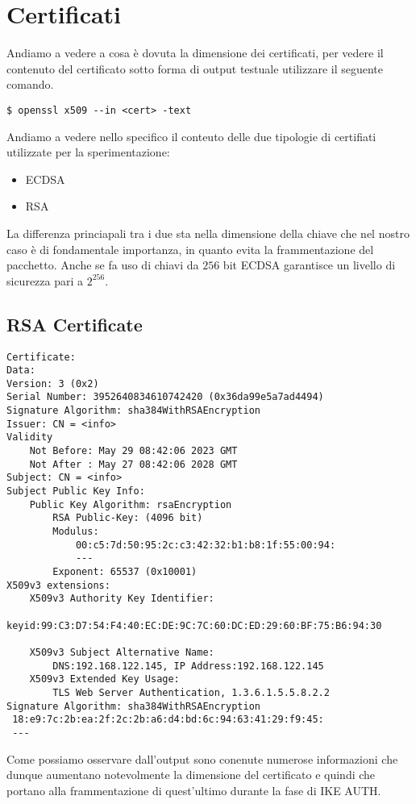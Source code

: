 \documentclass[
10pt, %
a4paper, %
oneside, %
headinclude,footinclude, %
BCOR5mm, %
]{scrartcl}
\begin{document}
\newpage
\section{Certificati}
\hypertarget{certificati}{}
Andiamo a vedere a cosa è dovuta la dimensione dei certificati, per vedere il contenuto del certificato sotto forma di output testuale utilizzare il seguente comando.
\begin{lstlisting}
$ openssl x509 --in <cert> -text
\end{lstlisting}

\vspace*{0.2cm}
\noindent
Andiamo a vedere nello specifico il conteuto delle due tipologie di certifiati utilizzate per la sperimentazione:
\begin{itemize}
    \item ECDSA
    \item RSA
\end{itemize}
\vspace*{0.2cm}
\noindent
La differenza princiapali tra i due sta nella dimensione della chiave che nel nostro caso è di fondamentale importanza, in quanto evita la frammentazione del pacchetto.
Anche se fa uso di chiavi da $256$ bit ECDSA garantisce un livello di sicurezza pari a $2^{256}$.
\subsection{RSA Certificate}
\begin{lstlisting}
Certificate:
Data:
Version: 3 (0x2)
Serial Number: 3952640834610742420 (0x36da99e5a7ad4494)
Signature Algorithm: sha384WithRSAEncryption
Issuer: CN = <info>
Validity
    Not Before: May 29 08:42:06 2023 GMT
    Not After : May 27 08:42:06 2028 GMT
Subject: CN = <info>
Subject Public Key Info:
    Public Key Algorithm: rsaEncryption
        RSA Public-Key: (4096 bit)
        Modulus:
            00:c5:7d:50:95:2c:c3:42:32:b1:b8:1f:55:00:94:
            ---
        Exponent: 65537 (0x10001)
X509v3 extensions:
    X509v3 Authority Key Identifier: 
        keyid:99:C3:D7:54:F4:40:EC:DE:9C:7C:60:DC:ED:29:60:BF:75:B6:94:30

    X509v3 Subject Alternative Name: 
        DNS:192.168.122.145, IP Address:192.168.122.145
    X509v3 Extended Key Usage: 
        TLS Web Server Authentication, 1.3.6.1.5.5.8.2.2
Signature Algorithm: sha384WithRSAEncryption
 18:e9:7c:2b:ea:2f:2c:2b:a6:d4:bd:6c:94:63:41:29:f9:45:
 ---
\end{lstlisting}
\vspace*{0.2cm}
\noindent
Come possiamo osservare dall'output sono conenute numerose informazioni che dunque aumentano notevolmente 
la dimensione del certificato e quindi che portano alla frammentazione di quest'ultimo durante la fase di IKE AUTH.
\end{document}
